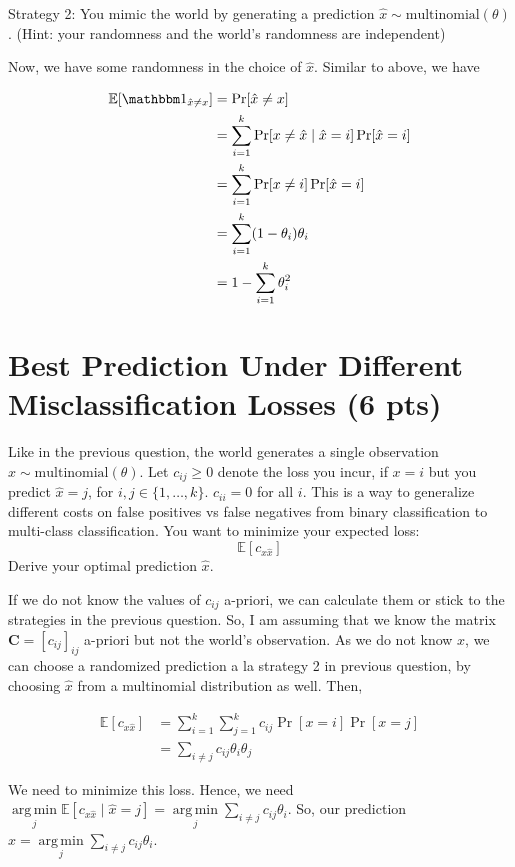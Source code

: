 \documentclass[a4paper]{article}
\theoremstyle{definition}
\DeclareMathOperator*{\argmin}{arg\,min}
\def\E{\mathbb E}
\def\ind{\mathbbm 1}
\newenvironment{soln}{
    \leavevmode\color{blue}\ignorespaces
}{}
\begin{document}
Strategy 2: You mimic the world by generating a prediction $\hat x \sim \mbox{multinomial}(\theta)$.  (Hint: your randomness and the world's randomness are independent)

\begin{soln}
    Now, we have some randomness in the choice of $\hat{x}$. Similar to above, we have

    \begin{align*}
        \E [\ind_{\hat{x} \neq x}] &= \Pr [\hat{x} \neq x] \\
        &= \sum\limits_{i = 1}^{k} \Pr [x \neq \hat{x} \mid \hat{x} = i] \Pr [\hat{x} = i] \\
        &= \sum\limits_{i = 1}^{k} \Pr [x \neq i] \Pr [\hat{x} = i] \\
        &= \sum\limits_{i = 1}^{k} (1 - \theta_i) \theta_i \\
        &= 1 - \sum\limits_{i = 1}^{k} \theta_i^2
    \end{align*}
\end{soln}
\pagebreak

\section{Best Prediction Under Different Misclassification Losses (6 pts)}
Like in the previous question, 
the world generates a single observation $x \sim \mbox{multinomial}(\theta)$.
Let $c_{ij} \ge 0$ denote the loss you incur, if $x=i$ but you predict $\hat x=j$, for $i,j \in \{1, \ldots, k\}$.
$c_{ii}=0$ for all $i$.
This is a way to generalize different costs on false positives vs false negatives from binary classification to multi-class classification.
You want to minimize your expected loss:
$$\E[c_{x \hat x}]$$
Derive your optimal prediction $\hat x$.

\begin{soln}
    If we do not know the values of $c_{ij}$ a-priori, we can calculate them or stick to the strategies in the previous question. So, I am assuming that we know the matrix $\mathbf{C} = [c_{ij}]_{ij}$ a-priori but not the world's observation. As we do not know $x$, we can choose a randomized prediction a la strategy 2 in previous question, by choosing $\hat{x}$ from a multinomial distribution as well. Then,

    \begin{align*}
        \E [c_{x\hat{x}}] &= \sum\limits_{i=1}^{k} \sum\limits_{j=1}^{k} c_{ij} \Pr [x = i] \Pr [x = j] \\
        &= \sum\limits_{i \neq j} c_{ij} \theta_i \theta_j
    \end{align*}

    We need to minimize this loss. Hence, we need $\argmin\limits_{j} \E [c_{x \hat{x}} \mid \hat{x} = j] = \argmin\limits_{j} \sum\limits_{i \neq j} c_{ij} \theta_i$. So, our prediction $\hat{x} = \argmin\limits_{j} \sum\limits_{i \neq j} c_{ij} \theta_i$.
    
\end{soln}
\pagebreak
\end{document}
